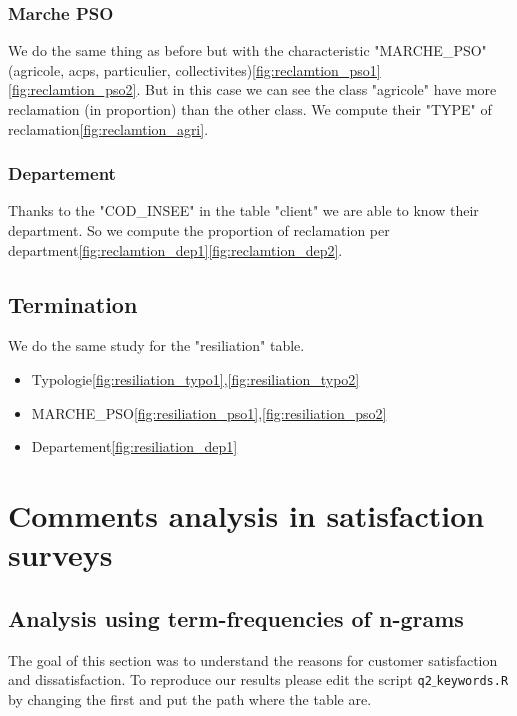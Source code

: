 \documentclass[a4paper, 11pt]{article}
\newcommand{\tw}[1]{\texttt{#1}}
\begin{document}
       \subsubsection{Marche PSO}
       		We do the same thing as before but with the characteristic "MARCHE\_PSO" (agricole, acps, particulier, collectivites)\ref{fig:reclamtion_pso1}\ref{fig:reclamtion_pso2}. But in this case we can see the class "agricole" have more reclamation (in proportion) than the other class. We compute their "TYPE" of reclamation\ref{fig:reclamtion_agri}. 
            
       \subsubsection{Departement}
       		Thanks to the "COD\_INSEE" in the table "client" we are able to know their department. So we compute the proportion of reclamation per department\ref{fig:reclamtion_dep1}\ref{fig:reclamtion_dep2}. 
            
       \subsection{Termination}
       		We do the same study for the "resiliation" table.
            \begin{itemize}
            \item Typologie\ref{fig:resiliation_typo1},\ref{fig:resiliation_typo2}
            \item MARCHE\_PSO\ref{fig:resiliation_pso1},\ref{fig:resiliation_pso2}
            \item Departement\ref{fig:resiliation_dep1}
            \end{itemize}

\section{Comments analysis in satisfaction surveys}
\label{sec:com_anal}
    \subsection{Analysis using term-frequencies of n-grams}
        The goal of this section was to understand the reasons for customer satisfaction and dissatisfaction. To reproduce our results please edit the script \tw{q2$\_$keywords.R} by changing the first and put the path where the table are.
\end{document}
